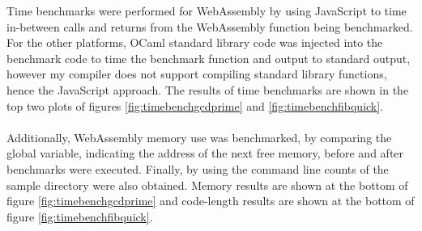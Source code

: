 Time benchmarks were performed for WebAssembly by using JavaScript to time in-between calls and returns from the WebAssembly function being benchmarked. For the other platforms, OCaml standard library code was injected into the benchmark code to time the benchmark function and output to standard output, however my compiler does not support compiling standard library functions, hence the JavaScript approach. The results of time benchmarks are shown in the top two plots of figures \ref{fig:timebenchgcdprime} and \ref{fig:timebenchfibquick}.
\\\\
Additionally, WebAssembly memory use was benchmarked, by comparing the  global variable, indicating the address of the next free memory, before and after benchmarks were executed. Finally, by using the  command line counts of the sample directory were also obtained. Memory results are shown at the bottom of figure \ref{fig:timebenchgcdprime} and code-length results are shown at the bottom of figure \ref{fig:timebenchfibquick}.

